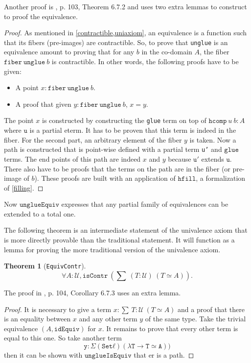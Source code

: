 \documentclass[12pt,a4paper,twoside,xetex]{book}
\newtheorem{theorem}{Theorem}[section]
\newcommand{\op}[1]{\mathtt{#1}}
\newcommand{\type}{\mathcal{U}}
\begin{document}
Another proof is \cite{Huber2016}, p. 103, Theorem 6.7.2 and uses two extra 
lemmas to construct to proof the equivalence.

\begin{proof}
As mentioned in \cref{contractible,uniaxiom}, an equivalence is a function such 
that its fibers (pre-images) are contractible. So, to prove that 
\texttt{unglue} is an equivalence amount to proving that for any $b$ in the 
co-domain $A$, the fiber $\op{fiber}\ \op{unglue} \ b$ is contractible. In 
other words, the following proofs have to be given:
\begin{itemize}
\item A point  $x : \op{fiber}\ \op{unglue} \ b$. 
\item A proof that given $y : \op{fiber}\ \op{unglue} \ b$, $x = y$. 
\end{itemize}
The point $x$ is constructed by constructing the \texttt{glue} term on top of 
$\texttt{hcomp} \ u \ b : A$ where $\op{u}$ is a partial eterm. It has to be 
proven that this term is indeed in the fiber. For the second part, an arbitrary 
element of the fiber $y$ is taken. Now a path is constructed that is point-wise 
defined with a partial term \texttt{u'} and $\op{glue}$ terms. The end points 
of this path are indeed $x$ and $y$ because $\op{u'}$ extends $\op{u}$. There 
also have to be proofs that the terms on the path are in the fiber (or 
pre-image of $b$). These proofs are built with an application of $\op{hfill}$, 
a formalization of \cref{filling}.
\end{proof}

Now $\op{unglueEquiv}$  expresses that any partial family of equivalences can 
be extended to a total one.

The following theorem is an intermediate statement of the univalence axiom that 
is more directly provable than the traditional statement. It will function as a 
lemma for proving the more traditional version of the univalence axiom.

\begin{theorem}[\texttt{EquivContr}]\label{contrSingl}
 $$\forall A : \type, \op{isContr} \ \left( \sum \ (T : \type) \  \left( T 
\simeq A \right) \right).$$ 
\end{theorem}


The proof in \cite{Huber2016}, p. 104, Corollary 6.7.3 uses an extra lemma.

\begin{proof}
It is necessary to give a term $x : \sum \ T : \type \  \left( T \simeq 
A \right)$ and a proof that there is an equality between $x$ and any other term 
$y$ of the same type. Take the trivial equivalence  $(A, \op{idEquiv})$ for 
$x$. It remains to prove that every other term is equal to this one. So take 
another term $$\op{y : Σ (Set ℓ) (λ T → T ≃ A))}$$ then it can be shown with 
$\op{unglueIsEquiv}$ that er is a path.
\end{proof}
\end{document}
